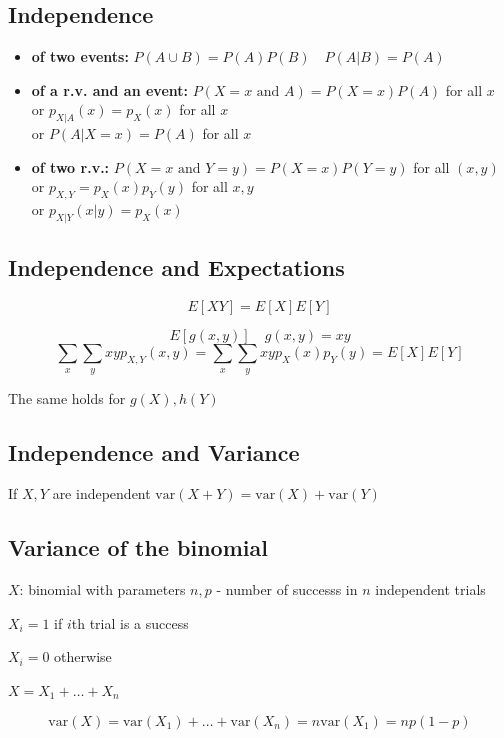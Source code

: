 \documentclass{article}
\begin{document}
\subsection*{Independence}
\begin{itemize}
    \item \textbf{of two events:} \(P(A \cup B) = P(A)P(B) \quad P(A|B) = P(A)\)

    \item \textbf{of a r.v. and an event:} \(P(X=x \text{ and } A) = P(X=x)P(A)\) for all \(x\) \\
    or \(p_{X|A}(x) = p_X(x)\) for all \(x\) \\
    or \(P(A|X=x) = P(A)\) for all \(x\)

    \item \textbf{of two r.v.:} \(P(X=x \text{ and } Y = y) = P(X=x)P(Y=y)\) for all \((x,y)\) \\
    or \(p_{X,Y} = p_X(x)p_Y(y)\) for all \(x,y\) \\
    or \(p_{X|Y}(x|y) = p_X(x)\)

\end{itemize}

\subsection*{Independence and Expectations}
\[
E[XY] = E[X]E[Y]
\]

\[
E[g(x,y)] \quad g(x,y) = xy
\]
\[
\sum_x \sum_y xy p_{X,Y}(x,y) = \sum_x \sum_y xy p_{X}(x) p_Y(y) = E[X]E[Y]
\]

The same holds for \(g(X), h(Y)\)

\subsection*{Independence and Variance}
If \(X,Y\) are independent \(\text{var}(X+Y) = \text{var}(X)+ \text{var}(Y)\)

\subsection*{Variance of the binomial}
\(X\): binomial with parameters \(n,p\)
 - number of successs in \(n\) independent trials

\(X_i = 1\) if \(i\)th trial is a success

\(X_i = 0 \) otherwise

\(X= X_1 + \dots + X_n\)

\[
\text{var}(X) = \text{var}(X_1)+ \dots + \text{var}(X_n) = n\text{var}(X_1) = np(1-p)
\]
\end{document}
